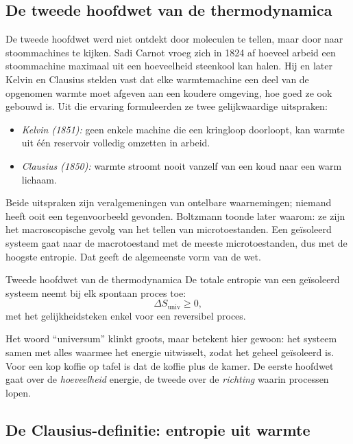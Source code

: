 \subsection{De tweede hoofdwet van de thermodynamica}

De tweede hoofdwet werd niet ontdekt door moleculen te tellen, maar door naar stoommachines te kijken. Sadi Carnot vroeg zich in 1824 af hoeveel arbeid een stoommachine maximaal uit een hoeveelheid steenkool kan halen. Hij en later Kelvin en Clausius stelden vast dat elke warmtemachine een deel van de opgenomen warmte moet afgeven aan een koudere omgeving, hoe goed ze ook gebouwd is. Uit die ervaring formuleerden ze twee gelijkwaardige uitspraken:
\begin{itemize}
\item \emph{Kelvin (1851):} geen enkele machine die een kringloop doorloopt, kan warmte uit \'e\'en reservoir volledig omzetten in arbeid.
\item \emph{Clausius (1850):} warmte stroomt nooit vanzelf van een koud naar een warm lichaam.
\end{itemize}
Beide uitspraken zijn veralgemeningen van ontelbare waarnemingen; niemand heeft ooit een tegenvoorbeeld gevonden. Boltzmann toonde later waarom: ze zijn het macroscopische gevolg van het tellen van microtoestanden. Een ge\"isoleerd systeem gaat naar de macrotoestand met de meeste microtoestanden, dus met de hoogste entropie. Dat geeft de algemeenste vorm van de wet.

\begin{definitie}{Tweede hoofdwet van de thermodynamica}
De totale entropie van een ge\"isoleerd systeem neemt bij elk spontaan proces toe:
\begin{equation}
\Delta S_{\text{univ}} \geq 0,
\end{equation}
met het gelijkheidsteken enkel voor een reversibel proces.
\end{definitie}

Het woord ``universum'' klinkt groots, maar betekent hier gewoon: het systeem samen met alles waarmee het energie uitwisselt, zodat het geheel ge\"isoleerd is. Voor een kop koffie op tafel is dat de koffie plus de kamer. De eerste hoofdwet gaat over de \emph{hoeveelheid} energie, de tweede over de \emph{richting} waarin processen lopen.

\subsection{De Clausius-definitie: entropie uit warmte}


